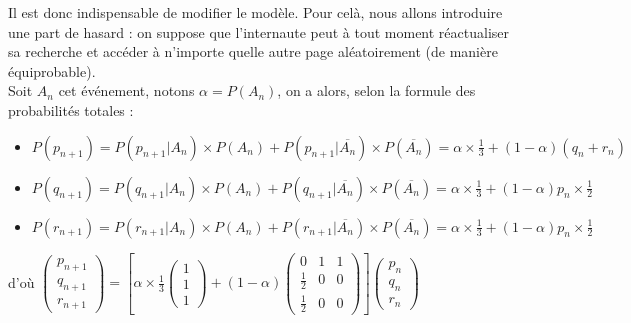 \documentclass[a4paper,10pt]{report}
\begin{document}
\indent Il est donc indispensable de modifier le modèle. Pour celà, nous allons introduire une part de hasard : on suppose que l'internaute peut à tout moment réactualiser sa recherche et accéder à n'importe quelle autre page aléatoirement (de manière équiprobable).\\
Soit $A_n$ cet événement, notons $\alpha =P(A_n)$, on a alors, selon la formule des probabilités totales :
\begin{itemize}
\item $P(p_{n+1})=P(p_{n+1}|A_n)\times P(A_n) + P(p_{n+1}|\overline{A_n})\times P(\overline{A_n}) = \alpha \times \frac{1}{3} + (1-\alpha)(q_n+r_n)$
\item $P(q_{n+1})=P(q_{n+1}|A_n)\times P(A_n) + P(q_{n+1}|\overline{A_n})\times P(\overline{A_n}) = \alpha \times \frac{1}{3} + (1-\alpha) p_n\times \frac{1}{2}$
\item $P(r_{n+1})=P(r_{n+1}|A_n)\times P(A_n) + P(r_{n+1}|\overline{A_n})\times P(\overline{A_n}) = \alpha \times \frac{1}{3} + (1-\alpha) p_n\times \frac{1}{2}$
\end{itemize}
d'où $\left( \begin{array}{c} p_{n+1} \\ q_{n+1} \\ r_{n+1} \end{array} \right)= \left[ \alpha \times \frac{1}{3} \left( \begin{array}{c} 1 \\ 1 \\ 1 \end{array} \right) + (1-\alpha) \left( \begin{array}{ccc} 0 & 1 & 1 \\ \frac{1}{2} & 0 & 0 \\ \frac{1}{2} & 0 & 0 \end{array} \right) \right] \left( \begin{array}{c} p_{n} \\ q_{n} \\ r_{n} \end{array} \right)$\\ \\
\end{document}
